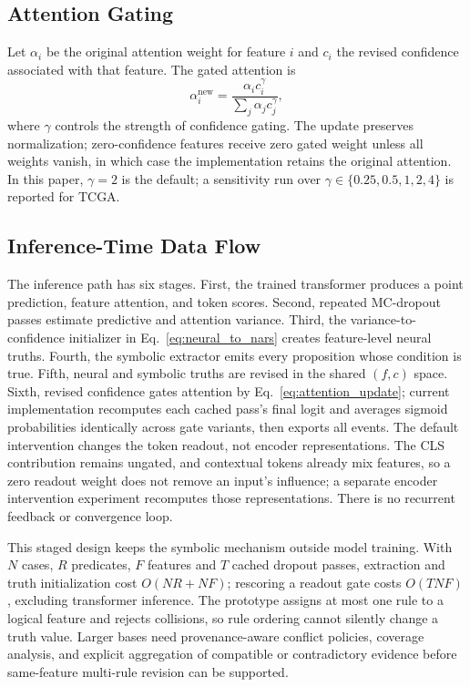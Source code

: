 \documentclass{article}
\begin{document}
\subsection{Attention Gating}

Let $\alpha_i$ be the original attention weight for feature $i$ and $c_i$ the revised confidence associated with that feature. The gated attention is
\begin{equation}
\alpha_i^{\text{new}}=
\frac{\alpha_i c_i^\gamma}{\sum_j \alpha_j c_j^\gamma},
\label{eq:attention_update}
\end{equation}
where $\gamma$ controls the strength of confidence gating. The update preserves normalization; zero-confidence features receive zero gated weight unless all weights vanish, in which case the implementation retains the original attention. In this paper, $\gamma=2$ is the default; a sensitivity run over $\gamma\in\{0.25,0.5,1,2,4\}$ is reported for TCGA.

\subsection{Inference-Time Data Flow}

The inference path has six stages. First, the trained transformer produces a point prediction, feature attention, and token scores. Second, repeated MC-dropout passes estimate predictive and attention variance. Third, the variance-to-confidence initializer in Eq.~\eqref{eq:neural_to_nars} creates feature-level neural truths. Fourth, the symbolic extractor emits every proposition whose condition is true. Fifth, neural and symbolic truths are revised in the shared $(f,c)$ space. Sixth, revised confidence gates attention by Eq.~\eqref{eq:attention_update}; current implementation recomputes each cached pass's final logit and averages sigmoid probabilities identically across gate variants, then exports all events. The default intervention changes the token readout, not encoder representations. The CLS contribution remains ungated, and contextual tokens already mix features, so a zero readout weight does not remove an input's influence; a separate encoder intervention experiment recomputes those representations. There is no recurrent feedback or convergence loop.

This staged design keeps the symbolic mechanism outside model training. With $N$ cases, $R$ predicates, $F$ features and $T$ cached dropout passes, extraction and truth initialization cost $O(NR+NF)$; rescoring a readout gate costs $O(TNF)$, excluding transformer inference. The prototype assigns at most one rule to a logical feature and rejects collisions, so rule ordering cannot silently change a truth value. Larger bases need provenance-aware conflict policies, coverage analysis, and explicit aggregation of compatible or contradictory evidence before same-feature multi-rule revision can be supported.
\end{document}
